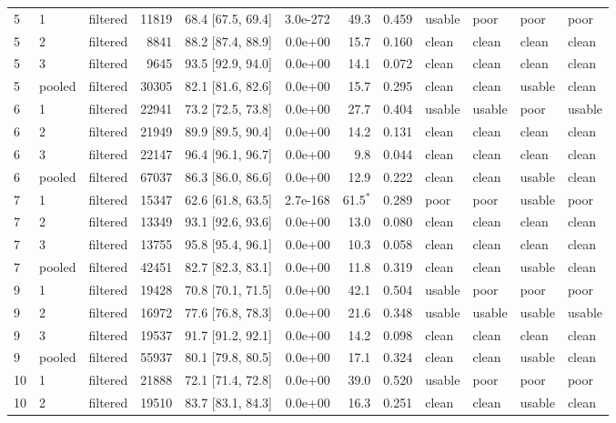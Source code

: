 \begin{longtable}{lllrrrrrllll}
5 & 1 & filtered & 11819 & 68.4 [67.5, 69.4] & 3.0e-272 & 49.3 & 0.459 & usable & poor & poor & poor \\
5 & 2 & filtered & 8841 & 88.2 [87.4, 88.9] & 0.0e+00 & 15.7 & 0.160 & clean & clean & clean & clean \\
5 & 3 & filtered & 9645 & 93.5 [92.9, 94.0] & 0.0e+00 & 14.1 & 0.072 & clean & clean & clean & clean \\
5 & pooled & filtered & 30305 & 82.1 [81.6, 82.6] & 0.0e+00 & 15.7 & 0.295 & clean & clean & usable & clean \\
6 & 1 & filtered & 22941 & 73.2 [72.5, 73.8] & 0.0e+00 & 27.7 & 0.404 & usable & usable & poor & usable \\
6 & 2 & filtered & 21949 & 89.9 [89.5, 90.4] & 0.0e+00 & 14.2 & 0.131 & clean & clean & clean & clean \\
6 & 3 & filtered & 22147 & 96.4 [96.1, 96.7] & 0.0e+00 & 9.8 & 0.044 & clean & clean & clean & clean \\
6 & pooled & filtered & 67037 & 86.3 [86.0, 86.6] & 0.0e+00 & 12.9 & 0.222 & clean & clean & usable & clean \\
7 & 1 & filtered & 15347 & 62.6 [61.8, 63.5] & 2.7e-168 & 61.5$^\ast$ & 0.289 & poor & poor & usable & poor \\
7 & 2 & filtered & 13349 & 93.1 [92.6, 93.6] & 0.0e+00 & 13.0 & 0.080 & clean & clean & clean & clean \\
7 & 3 & filtered & 13755 & 95.8 [95.4, 96.1] & 0.0e+00 & 10.3 & 0.058 & clean & clean & clean & clean \\
7 & pooled & filtered & 42451 & 82.7 [82.3, 83.1] & 0.0e+00 & 11.8 & 0.319 & clean & clean & usable & clean \\
9 & 1 & filtered & 19428 & 70.8 [70.1, 71.5] & 0.0e+00 & 42.1 & 0.504 & usable & poor & poor & poor \\
9 & 2 & filtered & 16972 & 77.6 [76.8, 78.3] & 0.0e+00 & 21.6 & 0.348 & usable & usable & usable & usable \\
9 & 3 & filtered & 19537 & 91.7 [91.2, 92.1] & 0.0e+00 & 14.2 & 0.098 & clean & clean & clean & clean \\
9 & pooled & filtered & 55937 & 80.1 [79.8, 80.5] & 0.0e+00 & 17.1 & 0.324 & clean & clean & usable & clean \\
10 & 1 & filtered & 21888 & 72.1 [71.4, 72.8] & 0.0e+00 & 39.0 & 0.520 & usable & poor & poor & poor \\
10 & 2 & filtered & 19510 & 83.7 [83.1, 84.3] & 0.0e+00 & 16.3 & 0.251 & clean & clean & usable & clean \\

\end{longtable}
